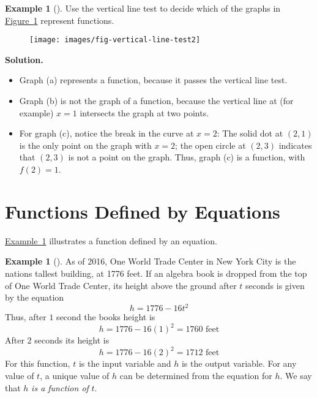 \documentclass[10pt,]{book}
\theoremstyle{plain}
\theoremstyle{definition}
\theoremstyle{definition}
\theoremstyle{definition}
\newtheorem{example}[theorem]{Example}
\theoremstyle{definition}
\numberwithin{equation}{section}
\let\oldsection\section
\renewcommand\section{\znewpage\oldsection}
\begin{document}
\begin{example}[]\label{example-vertical-line-test}
\hypertarget{p-41}{}%
Use the vertical line test to decide which of the graphs in \hyperref[fig-vertical-line-test2]{Figure~\ref{fig-vertical-line-test2}}  represent functions.%
\begin{figure}
\centering
\texttt{[image: images/fig-vertical-line-test2]}
\caption{\label{fig-vertical-line-test2}}
\end{figure}
\par\smallskip%
\noindent\textbf{Solution.}\hypertarget{solution-1}{}\quad%
\hypertarget{p-42}{}%
\leavevmode%
\begin{itemize}[label=\textbullet]
\item{}\hypertarget{p-43}{}%
Graph (a) represents a function, because it passes the vertical line test.%
\item{}\hypertarget{p-44}{}%
Graph (b) is not the graph of a function, because the vertical line at (for example) \(x = 1\) intersects the graph at two points.%
\item{}\hypertarget{p-45}{}%
For graph (c), notice the break in the curve at \(x = 2\): The solid dot at \((2, 1)\) is the only point on the graph with \(x = 2\); the open circle at \((2, 3)\) indicates that \((2, 3)\) is not a point on the graph. Thus, graph (c) is a function, with \(f(2) = 1\).%
\end{itemize}
%
\end{example}
\typeout{************************************************}
\typeout{************************************************}
\section[{Functions Defined by Equations}]{Functions Defined by Equations}\label{subsection-4}
\hypertarget{p-46}{}%
\hyperref[example-falling-book]{Example~\ref{example-falling-book}} illustrates a function defined by an equation.%
\begin{example}[]\label{example-falling-book}
\hypertarget{p-47}{}%
As of 2016,  One World Trade Center in New York City is the nations tallest building, at 1776 feet. If an algebra book is dropped from the top of One World Trade Center, its height above the ground after \(t\) seconds is given by the equation%
\begin{equation*}
h = 1776 - 16t^2
\end{equation*}
Thus, after \(1\) second the books height is%
\begin{equation*}
h = 1776 - 16(1)^2 = 1760 \text{ feet}
\end{equation*}
After \(2\) seconds its height is%
\begin{equation*}
h = 1776 - 16(2)^2 = 1712 \text{ feet}
\end{equation*}
For this function, \(t\) is the input variable and \(h\) is the output variable. For any value of \(t\), a unique value of \(h\) can be determined from the equation for \(h\). We say that \(h\) \emph{is a function of} \(t\).%
\end{example}
\typeout{************************************************}
\typeout{************************************************}
\end{document}
